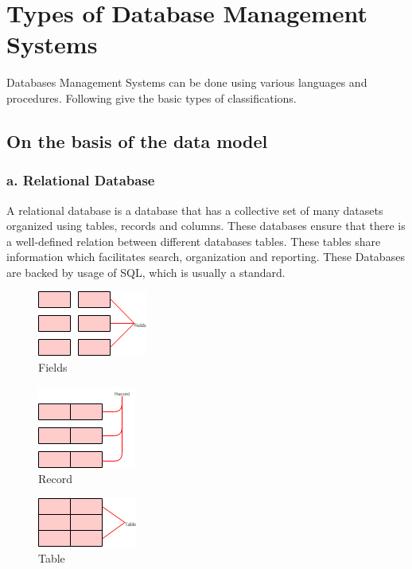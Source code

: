 \documentclass[BTech]{srmuthesis}
\begin{document}
\section{Types of Database Management Systems}
Databases Management Systems can be done using various languages and procedures. Following give the basic types of classifications.
\subsection{On the basis of the data model} 
\subsubsection{a. Relational Database}
A relational database is a database that has a collective set of many datasets organized using tables, records and columns. These databases ensure that there is a well-defined relation between different databases tables. These tables share information which facilitates search, organization and reporting.
These Databases are backed by usage of \ac{SQL}, which is usually a standard.
\begin{figure}[h!]
	\centering
	\includegraphics[scale=1.0]{Fields.png}
	\caption{Fields}
\end{figure}
\begin{figure}[h!]
	\centering
	\includegraphics[scale=1.0]{Record.png}
	\caption{Record}
\end{figure}
\begin{figure}[h!]
	\centering
	\includegraphics[scale=1.0]{Table.png}
	\caption{Table}
\end{figure}
\end{document}
